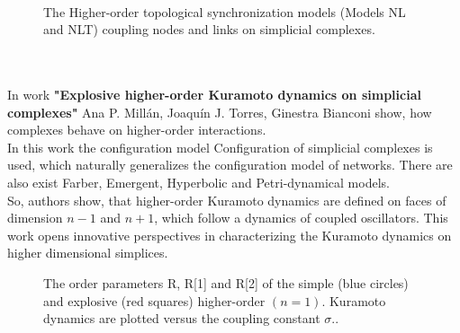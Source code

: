 \documentclass[draft]{article}
\newcommand\tab[1][1cm]{\hspace*{#1}}
\begin{document}
~\\
\begin{figure}[h]
\caption{The Higher-order topological synchronization models (Models NL and NLT) coupling nodes and links on simplicial complexes\cite{litlink6}.}
\label{ris:image}
\end{figure}\\
~\\
\tab In work \textbf{"Explosive higher-order Kuramoto dynamics on simplicial complexes"} Ana P. Millán, Joaquín J. Torres, Ginestra Bianconi show, how complexes behave on higher-order interactions.\\
\tab In this work the configuration model Configuration of simplicial complexes is used, which naturally generalizes the configuration model of networks. There are also exist Farber, Emergent, Hyperbolic and Petri-dynamical models.\\
\tab So, authors show, that higher-order Kuramoto dynamics are defined on faces of dimension $n-1$ and $n+1$, which follow a dynamics of coupled oscillators. This work opens innovative perspectives in characterizing the Kuramoto dynamics on higher dimensional simplices.\\
\begin{figure}[h]
\caption{The order parameters R, R[1] and R[2] of the simple (blue circles) and explosive (red squares) higher-order $(n = 1)$. Kuramoto dynamics are plotted versus the coupling constant $\sigma$.\cite{litlink7}.}
\label{ris:image}
\end{figure}\\
\end{document}
